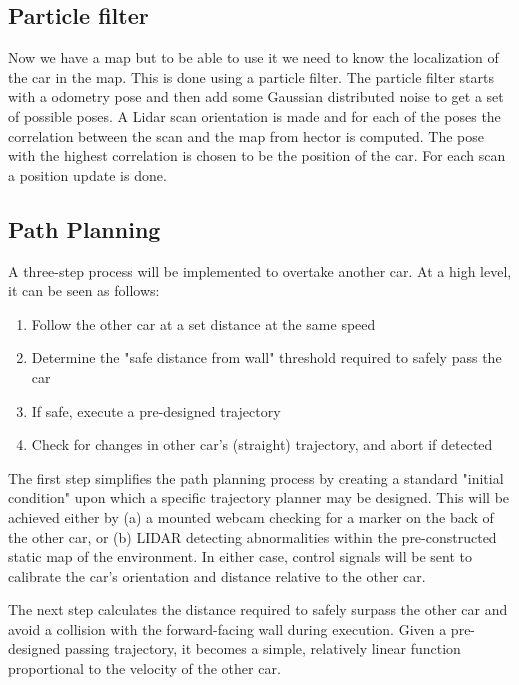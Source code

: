 \documentclass{LTHtwocol} %
\begin{document}
\subsection{Particle filter}
Now we have a map but to be able to use it we need to know the localization of the car in the map. This is done using a particle filter. The particle filter starts with a odometry pose and then add some Gaussian distributed noise to get a set of possible poses. A Lidar scan orientation is made and for each of the poses the correlation between the scan and the map from hector is computed. The pose with the highest correlation is chosen to be the position of the car. For each scan a position update is done.


\subsection{Path Planning}
A three-step process will be implemented to overtake another car. At a high level, it can be seen as follows:

\begin{enumerate}
	\item Follow the other car at a set distance at the same speed
	\item Determine the "safe distance from wall" threshold required to safely pass the car
	\item If safe, execute a pre-designed trajectory
	\item Check for changes in other car's (straight) trajectory, and abort if detected
\end{enumerate}

The first step simplifies the path planning process by creating a standard "initial condition" upon which a specific trajectory planner may be designed. This will be achieved either by (a) a mounted webcam checking for a marker on the back of the other car, or (b) LIDAR detecting abnormalities within the pre-constructed static map of the environment. In either case, control signals will be sent to calibrate the car's orientation and distance relative to the other car.

The next step calculates the distance required to safely surpass the other car and avoid a collision with the forward-facing wall during execution. Given a pre-designed passing trajectory, it becomes a simple, relatively linear function proportional to the velocity of the other car.
\end{document}
